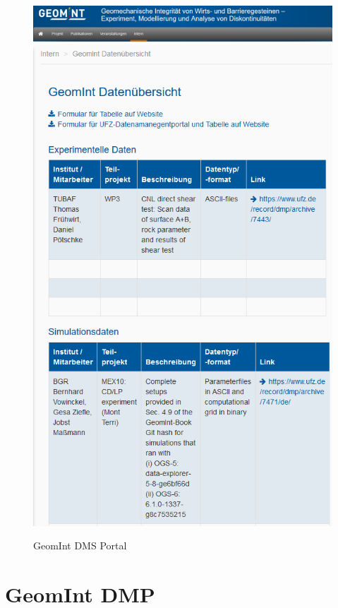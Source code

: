 \begin{figure}
\includegraphics[width=\textwidth]{figures/geomint-web-01.png}
\includegraphics[width=\textwidth]{figures/geomint-web-02.png}
\caption{GeomInt DMS Portal}
\label{fig:geomint-web}
\end{figure}

\section{GeomInt DMP}

